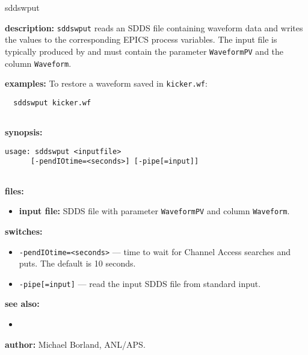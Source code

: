 \begin{sddsprog}{sddswput}
\item \textbf{description:}
  \verb+sddswput+ reads an SDDS file containing waveform data and writes the
  values to the corresponding EPICS process variables.  The input file is
  typically produced by  and must contain the parameter
  \verb|WaveformPV| and the column \verb|Waveform|.

\item \textbf{examples:}
  To restore a waveform saved in \verb|kicker.wf|:
  \begin{verbatim}
  sddswput kicker.wf
  
\end{verbatim}

\item \textbf{synopsis:}
  \begin{verbatim}
usage: sddswput <inputfile>
      [-pendIOtime=<seconds>] [-pipe[=input]]
  
\end{verbatim}

\item \textbf{files:}
\begin{itemize}
  \item \textbf{input file:} SDDS file with parameter \verb|WaveformPV| and column \verb|Waveform|.
\end{itemize}

\item \textbf{switches:}
\begin{itemize}
  \item {\tt -pendIOtime=<seconds>} --- time to wait for Channel Access searches and puts. The default is 10 seconds.
  \item {\tt -pipe[=input]} --- read the input SDDS file from standard input.
\end{itemize}

\item \textbf{see also:}
\begin{itemize}
  \item {}
\end{itemize}

\item \textbf{author:} Michael Borland, ANL/APS.
\end{sddsprog}
